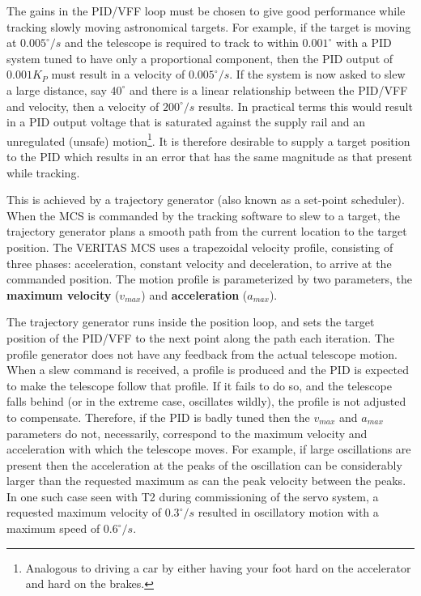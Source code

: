 \documentclass[letterpaper,12pt]{report}
\begin{document}
The gains in the PID/VFF loop must be chosen to give good performance
while tracking slowly moving astronomical targets. For example, if the
target is moving at $0.005^\circ/s$ and the telescope is required to
track to within $0.001^\circ$ with a PID system tuned to have only a
proportional component, then the PID output of $0.001 K_P$ must result
in a velocity of $0.005^\circ/s$. If the system is now asked to slew a
large distance, say $40^\circ$ and there is a linear relationship
between the PID/VFF and velocity, then a velocity of $200^\circ/s$
results. In practical terms this would result in a PID output voltage
that is saturated against the supply rail and an unregulated (unsafe)
motion\footnote{Analogous to driving a car by either having your foot
hard on the accelerator and hard on the brakes.}. It is therefore
desirable to supply a target position to the PID which results in an
error that has the same magnitude as that present while tracking.

This is achieved by a trajectory generator (also known as a set-point
scheduler). When the MCS is commanded by the tracking software to slew
to a target, the trajectory generator plans a smooth path from the
current location to the target position. The VERITAS MCS uses a
trapezoidal velocity profile, consisting of three phases:
acceleration, constant velocity and deceleration, to arrive at the
commanded position. The motion profile is parameterized by two
parameters, the \textbf{maximum velocity} ($v_{max}$) and
\textbf{acceleration} ($a_{max}$).

The trajectory generator runs inside the position loop, and sets the
target position of the PID/VFF to the next point along the path each
iteration. The profile generator does not have any feedback from the
actual telescope motion. When a slew command is received, a profile is
produced and the PID is expected to make the telescope follow that
profile. If it fails to do so, and the telescope falls behind (or in
the extreme case, oscillates wildly), the profile is not adjusted to
compensate. Therefore, if the PID is badly tuned then the $v_{max}$
and $a_{max}$ parameters do not, necessarily, correspond to the
maximum velocity and acceleration with which the telescope moves.
For example, if large oscillations are present then the acceleration
at the peaks of the oscillation can be considerably larger than the
requested maximum as can the peak velocity between the peaks. In one
such case seen with T2 during commissioning of the servo system, a
requested maximum velocity of $0.3^\circ/s$ resulted in oscillatory
motion with a maximum speed of $0.6^\circ/s$.
\end{document}

